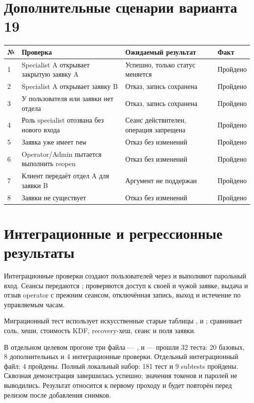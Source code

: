 \documentclass[12pt,a4paper]{article}
\begin{document}
\section{Дополнительные сценарии варианта 19}
\begin{longtable}{p{0.7cm}p{7.2cm}p{4.1cm}p{2.2cm}}
\toprule № & Проверка & Ожидаемый результат & Факт \\
\midrule\endhead
1 & Specialist A открывает закрытую заявку A & Успешно, только статус меняется & Пройдено \\
2 & Specialist A открывает заявку B & Отказ, запись сохранена & Пройдено \\
3 & У пользователя или заявки нет отдела & Отказ, запись сохранена & Пройдено \\
4 & Роль specialist отозвана без нового входа & Сеанс действителен, операция запрещена & Пройдено \\
5 & Заявка уже имеет \texttt{new} & Отказ без изменений & Пройдено \\
6 & Operator/Admin пытается выполнить reopen & Отказ без изменений & Пройдено \\
7 & Клиент передаёт отдел A для заявки B & Аргумент не поддержан & Пройдено \\
8 & Заявки не существует & Отказ без изменений & Пройдено \\
\bottomrule
\end{longtable}

\section{Интеграционные и регрессионные результаты}
Интеграционные проверки создают пользователей через  и выполняют парольный вход. Сеансы передаются ; проверяются доступ к своей и чужой заявке, выдача и отзыв operator с прежним сеансом, отключённая запись, выход и истечение по управляемым часам.

Миграционный тест использует искусственные старые таблицы ,  и ; сравнивает соль, хеши, стоимость KDF, recovery-хеш, сеанс и поля заявки.

В отдельном целевом прогоне три файла — ,  и  — прошли 32 теста: 20 базовых, 8 дополнительных и 4 интеграционные проверки. Отдельный интеграционный файл: 4 пройдены. Полный локальный набор: 181 тест и 9 subtests пройдены. Сквозная демонстрация  завершилась успешно; значения токенов и паролей не выводились. Результат относится к первому проходу и будет повторён перед релизом после добавления снимков.
\end{document}
